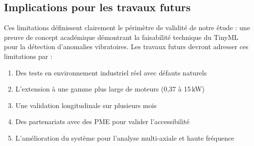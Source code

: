 \subsection{Implications pour les travaux futurs}

Ces limitations définissent clairement le périmètre de validité de notre étude : une preuve de concept académique démontrant la faisabilité technique du TinyML pour la détection d'anomalies vibratoires. Les travaux futurs devront adresser ces limitations par :

\begin{enumerate}
    \item Des tests en environnement industriel réel avec défauts naturels
    \item L'extension à une gamme plus large de moteurs (0,37 à 15\,kW)
    \item Une validation longitudinale sur plusieurs mois
    \item Des partenariats avec des PME pour valider l'accessibilité
    \item L'amélioration du système pour l'analyse multi-axiale et haute fréquence
\end{enumerate}